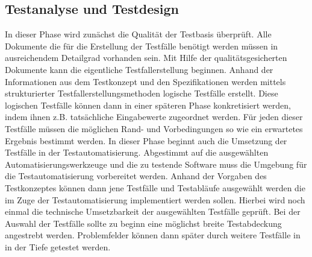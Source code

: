 \subsection{Testanalyse und Testdesign}
\label{subsec:testanalyse_und_design}
In dieser Phase wird zunächst die Qualität der Testbasis überprüft. Alle Dokumente die für die Erstellung der Testfälle benötigt werden müssen in ausreichendem Detailgrad vorhanden sein. Mit Hilfe der qualitätsgesicherten Dokumente kann die eigentliche Testfallerstellung beginnen.
Anhand der Informationen aus dem Testkonzept und den Spezifikationen werden mittels strukturierter Testfallerstellungsmethoden logische Testfälle erstellt. Diese logischen Testfälle können dann in einer späteren Phase konkretisiert werden, indem ihnen z.B. tatsächliche Eingabewerte zugeordnet werden. Für jeden dieser Testfälle müssen die möglichen Rand- und Vorbedingungen so wie ein erwartetes Ergebnis bestimmt werden. 
In dieser Phase beginnt auch die Umsetzung der Testfälle in der Testautomatisierung.
Abgestimmt auf die ausgewählten Automatisierungswerkzeuge und die zu testende Software muss die Umgebung für die Testautomatisierung vorbereitet werden. Anhand der Vorgaben des Testkonzeptes können dann jene Testfälle und Testabläufe ausgewählt werden die im Zuge der Testautomatisierung implementiert werden sollen. Hierbei wird noch einmal die technische Umsetzbarkeit der ausgewählten Testfälle geprüft. Bei der Auswahl der Testfälle sollte zu beginn eine möglichst breite Testabdeckung angestrebt werden.
Problemfelder können dann später durch weitere Testfälle in in der Tiefe getestet werden.

